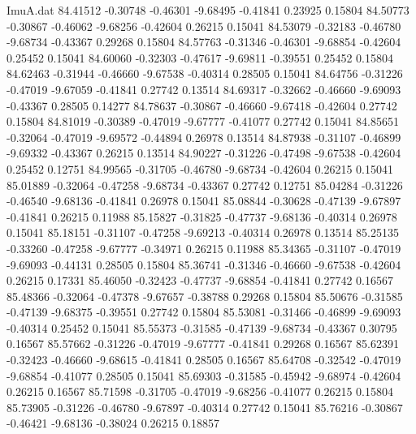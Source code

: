 \begin{filecontents}{ImuA.dat}
  84.41512   -0.30748   -0.46301   -9.68495   -0.41841    0.23925    0.15804
  84.50773   -0.30867   -0.46062   -9.68256   -0.42604    0.26215    0.15041
  84.53079   -0.32183   -0.46780   -9.68734   -0.43367    0.29268    0.15804
  84.57763   -0.31346   -0.46301   -9.68854   -0.42604    0.25452    0.15041
  84.60060   -0.32303   -0.47617   -9.69811   -0.39551    0.25452    0.15804
  84.62463   -0.31944   -0.46660   -9.67538   -0.40314    0.28505    0.15041
  84.64756   -0.31226   -0.47019   -9.67059   -0.41841    0.27742    0.13514
  84.69317   -0.32662   -0.46660   -9.69093   -0.43367    0.28505    0.14277
  84.78637   -0.30867   -0.46660   -9.67418   -0.42604    0.27742    0.15804
  84.81019   -0.30389   -0.47019   -9.67777   -0.41077    0.27742    0.15041
  84.85651   -0.32064   -0.47019   -9.69572   -0.44894    0.26978    0.13514
  84.87938   -0.31107   -0.46899   -9.69332   -0.43367    0.26215    0.13514
  84.90227   -0.31226   -0.47498   -9.67538   -0.42604    0.25452    0.12751
  84.99565   -0.31705   -0.46780   -9.68734   -0.42604    0.26215    0.15041
  85.01889   -0.32064   -0.47258   -9.68734   -0.43367    0.27742    0.12751
  85.04284   -0.31226   -0.46540   -9.68136   -0.41841    0.26978    0.15041
  85.08844   -0.30628   -0.47139   -9.67897   -0.41841    0.26215    0.11988
  85.15827   -0.31825   -0.47737   -9.68136   -0.40314    0.26978    0.15041
  85.18151   -0.31107   -0.47258   -9.69213   -0.40314    0.26978    0.13514
  85.25135   -0.33260   -0.47258   -9.67777   -0.34971    0.26215    0.11988
  85.34365   -0.31107   -0.47019   -9.69093   -0.44131    0.28505    0.15804
  85.36741   -0.31346   -0.46660   -9.67538   -0.42604    0.26215    0.17331
  85.46050   -0.32423   -0.47737   -9.68854   -0.41841    0.27742    0.16567
  85.48366   -0.32064   -0.47378   -9.67657   -0.38788    0.29268    0.15804
  85.50676   -0.31585   -0.47139   -9.68375   -0.39551    0.27742    0.15804
  85.53081   -0.31466   -0.46899   -9.69093   -0.40314    0.25452    0.15041
  85.55373   -0.31585   -0.47139   -9.68734   -0.43367    0.30795    0.16567
  85.57662   -0.31226   -0.47019   -9.67777   -0.41841    0.29268    0.16567
  85.62391   -0.32423   -0.46660   -9.68615   -0.41841    0.28505    0.16567
  85.64708   -0.32542   -0.47019   -9.68854   -0.41077    0.28505    0.15041
  85.69303   -0.31585   -0.45942   -9.68974   -0.42604    0.26215    0.16567
  85.71598   -0.31705   -0.47019   -9.68256   -0.41077    0.26215    0.15804
  85.73905   -0.31226   -0.46780   -9.67897   -0.40314    0.27742    0.15041
  85.76216   -0.30867   -0.46421   -9.68136   -0.38024    0.26215    0.18857

\end{filecontents}
